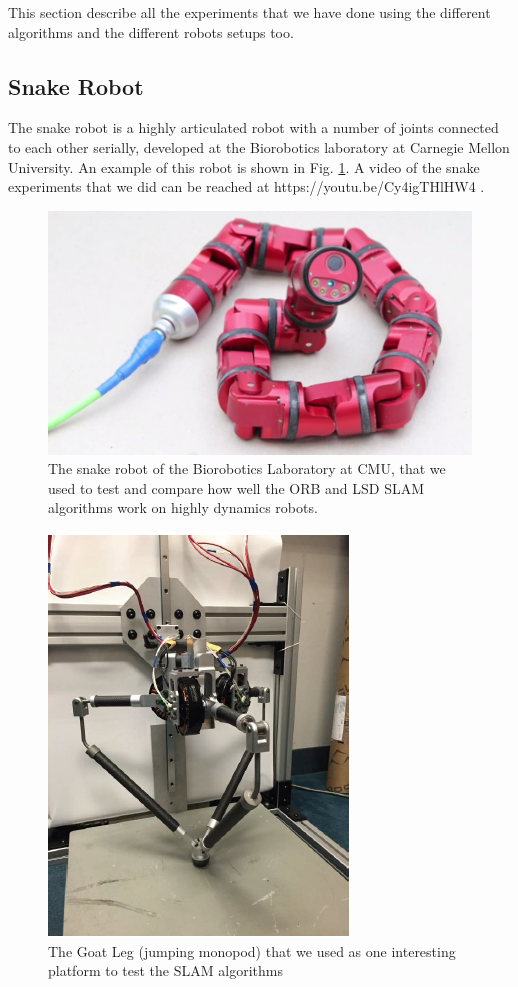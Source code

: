 This section describe all the experiments that we have done  using the different algorithms and the different robots setups too.

\subsection{Snake Robot}
The snake robot is a highly articulated robot with a number of joints connected to each other serially, developed at the Biorobotics laboratory at Carnegie Mellon University. An example of this robot is shown in Fig. \ref{fig:snake}. A video of the snake experiments that we did can be reached at https://youtu.be/Cy4igTHlHW4 .
\begin{figure}[t]\label{fig:snake}
	\centering
	\includegraphics[width=0.7\linewidth]{figures/snake}
	\caption{The snake robot of the Biorobotics Laboratory at CMU, that we used to test and compare how well the ORB and LSD SLAM algorithms work on highly dynamics robots. }
	\label{fig:snake}
\end{figure}


\begin{figure}[t]\label{fig:goat}
	\centering
	\includegraphics[width=0.7\linewidth]{figures/goat}
	\caption{The Goat Leg (jumping monopod) that we used as one interesting platform to test the SLAM algorithms}
	\label{fig:goat}
\end{figure}

